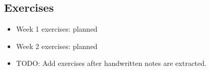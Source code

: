 \subsection{Exercises}

\begin{itemize}
  \item Week 1 exercises: planned
  \item Week 2 exercises: planned
  \item TODO: Add exercises after handwritten notes are extracted.
\end{itemize}
